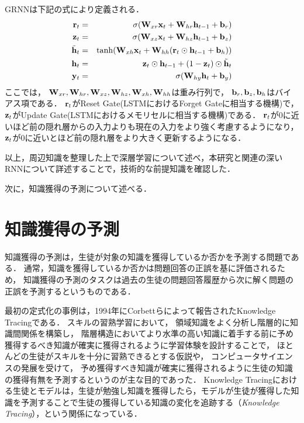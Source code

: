 GRNNは下記の式により定義される．
\begin{eqnarray}
\label{eq:grurnn1}
{\bf r}_t &=& \sigma({\bf W}_{xr}{\bf x}_t + {\bf W}_{hr}{\bf h}_{t-1} + {\bf b}_r)\\
\label{eq:grurnn2}
{\bf z}_t &=& \sigma({\bf W}_{xz}{\bf x}_t + {\bf W}_{hz}{\bf h}_{t-1} + {\bf b}_z)\\
\label{eq:grurnn3}
\tilde{{\bf h}}_t &=& \tanh({\bf W}_{xh}{\bf x}_t + {\bf W}_{hh}({\bf r}_t \odot {\bf h}_{t-1} + {\bf b}_h))\\
\label{eq:grurnn4}
{\bf h}_t &=& {\bf z}_t \odot {\bf h}_{t-1} + (1 - {\bf z}_t) \odot \tilde{{\bf h}}_t\\
\label{eq:grurnn5}
{\bf y}_t &=& \sigma( {\bf W}_{hy} {\bf h}_t + {\bf b}_y)
\end{eqnarray}
ここでは，
${\bf W}_{xr}, {\bf W}_{hr}, {\bf W}_{xz}, {\bf W}_{hz}, {\bf W}_{xh}, {\bf W}_{hh}$は重み行列で， 
${\bf b}_r, {\bf b}_z, {\bf b}_h$はバイアス項である．
${\bf r}_t$がReset Gate(LSTMにおけるForget Gateに相当する機構)で，  
${\bf z}_t$がUpdate Gate(LSTMにおけるメモリセルに相当する機構)である．
${\bf r}_t$が0に近いほど前の隠れ層からの入力よりも現在の入力をより強く考慮するようになり，
${\bf z}_t$が0に近いとほど前の隠れ層をより大きく更新するようになる．


\vvspace


以上，周辺知識を整理した上で深層学習について述べ，本研究と関連の深いRNNについて詳述することで，技術的な前提知識を確認した．

次に，知識獲得の予測について述べる．



\section{知識獲得の予測}
知識獲得の予測は，生徒が対象の知識を獲得しているか否かを予測する問題である．
通常，知識を獲得しているか否かは問題回答の正誤を基に評価されるため，
知識獲得の予測のタスクは過去の生徒の問題回答履歴から次に解く問題の正誤を予測するというものである．

最初の定式化の事例は，1994年にCorbettらによって報告されたKnowledge Tracing\cite{corbett1994knowledge}である．
スキルの習熟学習において，
領域知識をよく分析し階層的に知識間関係を構築し，
階層構造においてより水準の高い知識に着手する前に予め獲得するべき知識が確実に獲得されるように学習体験を設計することで，
ほとんどの生徒がスキルを十分に習熟できるとする仮説\cite{keller1968good, bloom1968learning}や，
コンピュータサイエンスの発展を受けて，
予め獲得すべき知識が確実に獲得されるように生徒の知識の獲得有無を予測するというのが主な目的であった．
Knowledge Tracingにおける生徒とモデルは，生徒が勉強し知識を獲得したら，モデルが生徒が獲得した知識を予測することで生徒の獲得している知識の変化を追跡する（{\it Knowledge Tracing}），という関係になっている．


